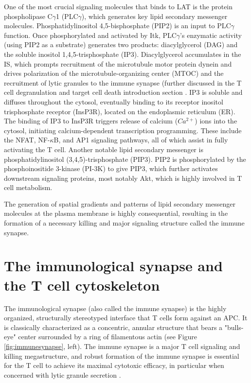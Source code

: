 One of the most crucial signaling molecules that binds to LAT is the protein phospholipase C$\gamma$1 (PLC$\gamma$), which generates key lipid secondary messenger molecules. Phosphatidylinositol 4,5-bisphosphate (PIP2) is an input to PLC$\gamma$ function. Once phosphorylated and activated by Itk, PLC$\gamma$'s enzymatic activity (using PIP2 as a substrate) generates two products: diacylglycerol (DAG) and the soluble inositol 1,4,5-trisphosphate (IP3). Diacylglycerol accumulates in the IS, which prompts recruitment of the microtubule motor protein dynein and drives polarization of the microtubule-organizing center (MTOC) \cite{Quann2009} and the recruitment of lytic granules to the immune synapse (further discussed in the T cell degranulation and target cell death introduction section \cite{Stinchcombe2006}. IP3 is soluble and diffuses throughout the cytosol, eventually binding to its receptor inositol trisphosphate receptor (InsP3R), located on the endoplasmic reticulum (ER). The binding of IP3 to InsP3R triggers release of calcium ($Ca^{2+}$) ions into the cytosol, initiating calcium-dependent transcription programming. These include the NFAT, NF-$\kappa$B, and AP1 signaling pathways, all of which assist in fully activating the T cell. Another notable lipid secondary messenger is phosphatidylinositol (3,4,5)-trisphosphate (PIP3). PIP2 is phosphorylated by the phosphoinositide 3-kinase (PI-3K) to give PIP3, which further activates downstream signaling proteins, most notably Akt, which is highly involved in T cell metabolism.

The generation of spatial gradients and patterns of lipid secondary messenger molecules at the plasma membrane is highly consequential, resulting in the formation of a necessary killing and major signaling structure called the immune synapse. 

\section{The immunological synapse and the T cell cytoskeleton}
The immunological synapse (also called the immune synapse) is the highly organized, structurally stereotyped interface that T cells form against an APC. It is classically characterized as a concentric, annular structure that bears a "bulls-eye" center surrounded by a ring of filamentous actin (see Figure \ref{fig:immunesynapse}, left). The immune synapse is a major T cell signaling and killing megastructure, and robust formation of the immune synapse is essential for the T cell to achieve its maximal cytotoxic efficacy, in particular when concerned with lytic granule secretion \cite{Ritter2015}.

